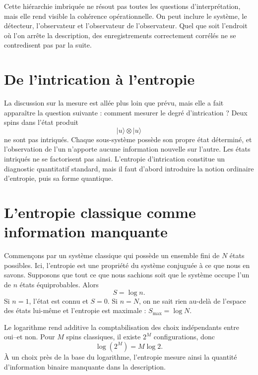 Cette hiérarchie imbriquée ne résout pas toutes les questions d’interprétation, mais elle rend visible la cohérence opérationnelle. On peut inclure le système, le détecteur, l’observateur et l’observateur de l’observateur. Quel que soit l’endroit où l’on arrête la description, des enregistrements correctement corrélés ne se contredisent pas par la suite.

\section{De l’intrication à l’entropie}

La discussion sur la mesure est allée plus loin que prévu, mais elle a fait apparaître la question suivante : comment mesurer le degré d’intrication ? Deux spins dans l’état produit
\begin{equation}
|u\rangle\otimes|u\rangle
\end{equation}
ne sont pas intriqués. Chaque sous-système possède son propre état déterminé, et l’observation de l’un n’apporte aucune information nouvelle sur l’autre. Les états intriqués ne se factorisent pas ainsi. L’entropie d’intrication constitue un diagnostic quantitatif standard, mais il faut d’abord introduire la notion ordinaire d’entropie, puis sa forme quantique.

\section{L’entropie classique comme information manquante}

Commençons par un système classique qui possède un ensemble fini de \(N\) états possibles. Ici, l’entropie est une propriété du système conjuguée à ce que nous en savons. Supposons que tout ce que nous sachions soit que le système occupe l’un de \(n\) états équiprobables. Alors
\begin{equation}
S=\log n.
\end{equation}
Si \(n=1\), l’état est connu et \(S=0\). Si \(n=N\), on ne sait rien au-delà de l’espace des états lui-même et l’entropie est maximale : \(S_{\max}=\log N\).

Le logarithme rend additive la comptabilisation des choix indépendants entre oui--et non. Pour \(M\) spins classiques, il existe \(2^M\) configurations, donc
\begin{equation}
\log(2^M)=M\log 2.
\end{equation}
À un choix près de la base du logarithme, l’entropie mesure ainsi la quantité d’information binaire manquante dans la description.

